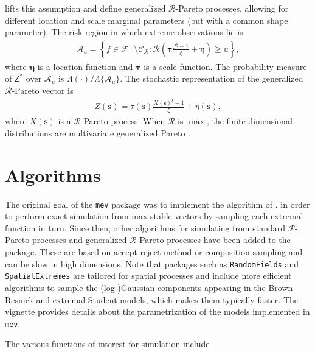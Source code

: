 \documentclass[]{book}
\begin{document}
\citet{deFondeville:thesis} lifts this assumption and define generalized \(\mathcal{R}\)-Pareto processes, allowing for different location and scale marginal parameters (but with a common shape parameter).
The risk region in which extreme observations lie is
\begin{align*}
\mathcal{A}_u= 
\left\{f \in \mathcal{F}^+ \setminus \mathcal{C}_{\mathcal{R}}: \mathcal{R}\left( \boldsymbol{\tau} \frac{f^\xi-1}{\xi}+\boldsymbol{\eta}\right) \geq u\right\},
\end{align*}
where \(\boldsymbol{\eta}\) is a location function and \(\boldsymbol{\tau}\) is a scale function.
The probability measure of \(\mathsf{Z}^*\) over \(\mathcal{A}_u\) is \(\Lambda(\cdot)/\Lambda\{\mathcal{A}_u\}\).
The stochastic representation of the generalized \(\mathcal{R}\)-Pareto vector is
\begin{align}
    Z(\boldsymbol{s}) = \tau(\boldsymbol{s}) \frac{X(\boldsymbol{s})^{\xi}-1}{\xi}+ \eta(\boldsymbol{s}), 
\end{align}
where \(X(\boldsymbol{s})\) is a \(\mathcal{R}\)-Pareto process. When \(\mathcal{R}\) is \(\max\), the finite-dimensional distributions are multivariate generalized Pareto \citep{Rootzen:2017}.

\hypertarget{algorithms}{%
\section{Algorithms}\label{algorithms}}

The original goal of the \texttt{mev} package was to implement the algorithm of \citet{Dombry:2016}, in order to perform exact simulation from max-stable vectors by sampling each extremal function in turn. Since then, other algorithms for simulating from standard \(\mathcal{R}\)-Pareto processes and generalized \(\mathcal{R}\)-Pareto processes have been added to the package. These are based on accept-reject method or composition sampling and can be slow in high dimensions. Note that packages such as \texttt{RandomFields} and \texttt{SpatialExtremes} are tailored for spatial processes and include more efficient algorithms to sample the (log-)Gaussian components appearing in the Brown--Resnick and extremal Student models, which makes them typically faster. The vignette provides details about the parametrization of the models implemented in \texttt{mev}.

The various functions of interest for simulation include
\end{document}
